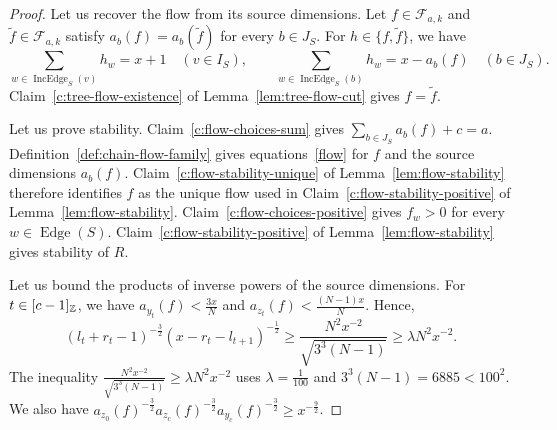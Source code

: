 \begin{proof}
 Let us recover the flow from its source dimensions.
Let $f\in\mathcal F_{a,k}$ and $\widetilde f\in\mathcal F_{a,k}$ satisfy $a_b(f)=a_b(\widetilde f)$ for every $b\in J_S$.
For $h\in\{f,\widetilde f\}$, we have
\[
 \sum_{w\in\operatorname{IncEdge}_S(v)}h_w=x+1\quad(v\in I_S),\qquad
 \sum_{w\in\operatorname{IncEdge}_S(b)}h_w=x-a_b(f)\quad(b\in J_S).
\]
Claim~\ref{c:tree-flow-existence} of Lemma~\ref{lem:tree-flow-cut} gives $f=\widetilde f$.

 Let us prove stability.
Claim~\ref{c:flow-choices-sum} gives $\sum_{b\in J_S}a_b(f)+c=a$.
Definition~\ref{def:chain-flow-family} gives equations~\eqref{flow} for $f$ and the source dimensions $a_b(f)$.
Claim~\ref{c:flow-stability-unique} of Lemma~\ref{lem:flow-stability} therefore identifies $f$ as the unique flow used in Claim~\ref{c:flow-stability-positive} of Lemma~\ref{lem:flow-stability}.
Claim~\ref{c:flow-choices-positive} gives $f_w>0$ for every $w\in\operatorname{Edge}(S)$.
Claim~\ref{c:flow-stability-positive} of Lemma~\ref{lem:flow-stability}
gives stability of $R$.

 Let us bound the products of inverse powers of the source dimensions.
For $t\in[c-1]_{\mathbb Z}$, we have $a_{y_t}(f)<\frac{3x}{N}$ and $a_{z_t}(f)<\frac{(N-1)x}{N}$.
Hence,
\[
(l_t+r_t-1)^{-\frac{3}{2}}
(x-r_t-l_{t+1})^{-\frac{1}{2}}
\ge\frac{N^2x^{-2}}{\sqrt{3^3(N-1)}}
\ge\lambda N^2x^{-2}.
\]
The inequality $\frac{N^2x^{-2}}{\sqrt{3^3(N-1)}}\ge\lambda N^2x^{-2}$ uses $\lambda=\frac1{100}$ and $3^3(N-1)=6885<100^2$.
We also have $a_{z_0}(f)^{-\frac32}a_{z_c}(f)^{-\frac32}a_{y_c}(f)^{-\frac32}\ge x^{-\frac92}$.
\end{proof}

